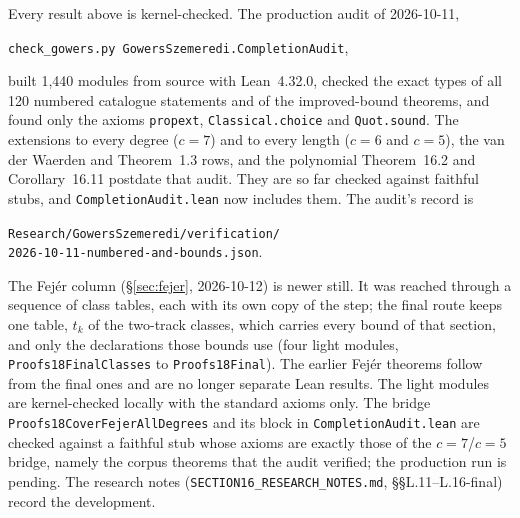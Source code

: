 \documentclass[11pt]{article}
\theoremstyle{definition}
\theoremstyle{remark}
\newcommand{\lean}[1]{\texttt{#1}}
\begin{document}
Every result above is kernel-checked. The production audit of 2026-10-11,
\begin{center}\small
\lean{check\_gowers.py GowersSzemeredi.CompletionAudit},
\end{center}
built 1,440 modules from source with Lean~4.32.0, checked the exact types of
all 120 numbered catalogue statements and of the improved-bound theorems,
and found only the axioms \lean{propext}, \lean{Classical.choice} and
\lean{Quot.sound}. The extensions to every degree ($c=7$) and to every
length ($c=6$ and $c=5$), the van der Waerden and Theorem~1.3 rows, and the
polynomial Theorem~16.2 and Corollary~16.11 postdate that audit. They are so far checked against
faithful stubs, and \lean{CompletionAudit.lean} now includes them. The
audit's record is
\begin{center}\small
\lean{Research/GowersSzemeredi/verification/}\\
\lean{2026-10-11-numbered-and-bounds.json}.
\end{center}
The Fej\'er column (\S\ref{sec:fejer}, 2026-10-12) is newer still. It was
reached through a sequence of class tables, each with its own copy of the
step; the final route keeps one table, $t_k$ of the two-track classes, which
carries every bound of that section, and only the declarations those bounds
use (four light modules, \lean{Proofs18FinalClasses} to \lean{Proofs18Final}).
The earlier Fej\'er theorems follow from the final ones and are no longer
separate Lean results. The light modules are kernel-checked locally with the
standard axioms only. The bridge \lean{Proofs18CoverFejerAllDegrees} and its
block in \lean{CompletionAudit.lean} are checked against a faithful stub
whose axioms are exactly those of the $c=7$/$c=5$ bridge, namely the corpus
theorems that the audit verified; the production run is pending. The
research notes (\lean{SECTION16\_RESEARCH\_NOTES.md}, \S\S L.11--L.16-final)
record the development.
\end{document}
